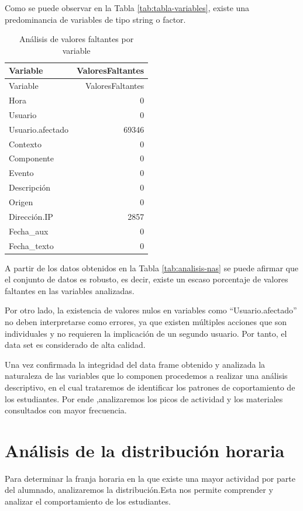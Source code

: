 \documentclass[notspecified,article,submit,moreauthors,pdftex]{Definitions/mdpi}
\begin{document}
Como se puede observar en la Tabla \ref{tab:tabla-variables}, existe una
predominancia de variables de tipo string o factor.

\begin{longtable}[]{@{}lr@{}}
\caption{Análisis de valores faltantes por variable}\tabularnewline
\toprule\noalign{}
Variable & ValoresFaltantes \\
\midrule\noalign{}
\endfirsthead
\toprule\noalign{}
Variable & ValoresFaltantes \\
\midrule\noalign{}
\endhead
\bottomrule\noalign{}
\endlastfoot
Hora & 0 \\
Usuario & 0 \\
Usuario.afectado & 69346 \\
Contexto & 0 \\
Componente & 0 \\
Evento & 0 \\
Descripción & 0 \\
Origen & 0 \\
Dirección.IP & 2857 \\
Fecha\_aux & 0 \\
Fecha\_texto & 0 \\
\end{longtable}

A partir de los datos obtenidos en la Tabla \ref{tab:analisis-nas} se
puede afirmar que el conjunto de datos es robusto, es decir, existe un
escaso porcentaje de valores faltantes en las variables analizadas.

Por otro lado, la existencia de valores nulos en variables como
``Usuario.afectado'' no deben interpretarse como errores, ya que existen
múltiples acciones que son individuales y no requieren la implicación de
un segundo usuario. Por tanto, el data set es considerado de alta
calidad.

Una vez confirmada la integridad del data frame obtenido y analizada la
naturaleza de las variables que lo componen procedemos a realizar una
análisis descriptivo, en el cual trataremos de identificar los patrones
de coportamiento de los estudiantes. Por ende ,analizaremos los picos de
actividad y los materiales consultados con mayor frecuencia.

\section{Análisis de la distribución
horaria}\label{anuxe1lisis-de-la-distribuciuxf3n-horaria}

Para determinar la franja horaria en la que existe una mayor actividad
por parte del alumnado, analizaremos la distribución.Esta nos permite
comprender y analizar el comportamiento de los estudiantes.
\end{document}
